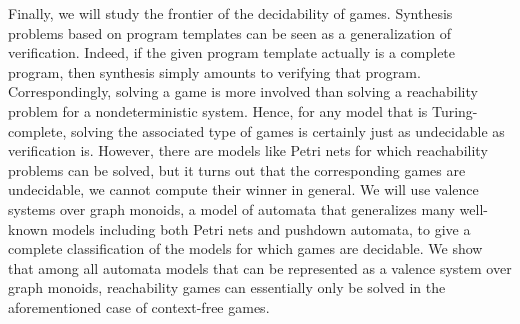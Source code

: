\documentclass[../../diss.tex]{subfiles}
\begin{document}
Finally, we will study the frontier of the decidability of games.
Synthesis problems based on program templates can be seen as a generalization of verification.
Indeed, if the given program template actually is a complete program, then synthesis simply amounts to verifying that program.
Correspondingly, solving a game is more involved than solving \eg a reachability problem for a nondeterministic system.
Hence, for any model that is Turing-complete, solving the associated type of games is certainly just as undecidable as verification is.
However, there are models like Petri nets for which reachability problems can be solved, but it turns out that the corresponding games are undecidable, \ie we cannot compute their winner in general.
We will use valence systems over graph monoids, a model of automata that generalizes many well-known models including both Petri nets and pushdown automata, to give a complete classification of the models for which games are decidable.
We show that among all automata models that can be represented as a valence system over graph monoids, reachability games can essentially only be solved in the aforementioned case of context-free games.
\end{document}
